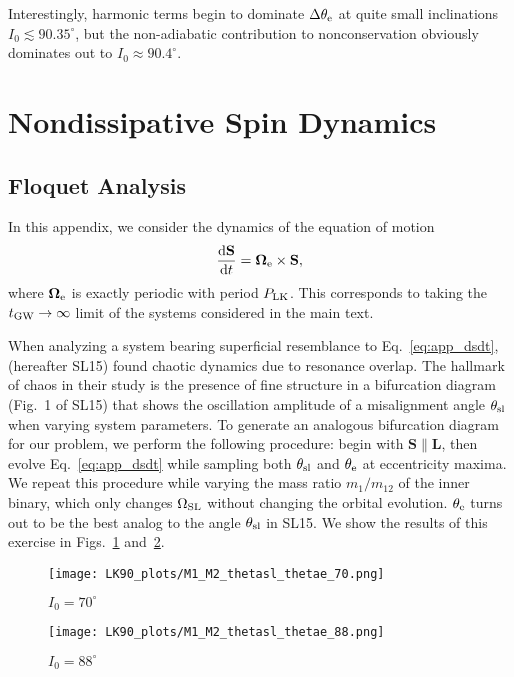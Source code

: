 \documentclass[
        twocolumn,
        twocolappendix
    ]{aastex63}
\newcommand*{\rd}[2]{\frac{\mathrm{d}#1}{\mathrm{d}#2}}
\renewcommand*{\bm}[1]{\boldsymbol{\mathbf{#1}}}
\begin{document}
Interestingly, harmonic terms begin to dominate $\Delta \theta_{\rm e}$ at quite
small inclinations $I_0 \lesssim 90.35^\circ$, but the non-adiabatic
contribution to nonconservation obviously dominates out to $I_0 \approx
90.4^\circ$.




\appendix

\section{Nondissipative Spin Dynamics}\label{app:nondisp}

\subsection{Floquet Analysis}

In this appendix, we consider the dynamics of the equation of motion
\begin{equation}
    \rd{\bm{S}}{t} = \bm{\Omega}_{\rm e} \times \bm{S},\label{eq:app_dsdt}
\end{equation}
where $\bm{\Omega}_{\rm e}$ is exactly periodic with period $P_{\rm LK}$. This
corresponds to taking the $t_{\rm GW} \to \infty$ limit of the systems
considered in the main text.

When analyzing a system bearing superficial resemblance to
Eq.~\eqref{eq:app_dsdt}, \citet{storch} (hereafter SL15) found chaotic dynamics
due to resonance overlap. The hallmark of chaos in their study is the presence
of fine structure in a bifurcation diagram (Fig.~1 of SL15) that shows the
oscillation amplitude of a misalignment angle $\theta_{\rm sl}$ when varying
system parameters. To generate an analogous bifurcation diagram for our problem,
we perform the following procedure: begin with $\bm{S} \parallel \bm{L}$, then
evolve Eq.~\eqref{eq:app_dsdt} while sampling both $\theta_{\rm sl}$ and
$\theta_{\rm e}$ at eccentricity maxima. We repeat this procedure while varying
the mass ratio $m_1 / m_{12}$ of the inner binary, which only changes
$\Omega_{\rm SL}$ without changing the orbital evolution. $\theta_{\rm e}$ turns
out to be the best analog to the angle $\theta_{\rm sl}$ in SL15. We show the
results of this exercise in Figs.~\ref{fig:bifurcation_70}
and~\ref{fig:bifurcation_88}.
\begin{figure}
    \centering
    \texttt{[image: LK90\_plots/M1\_M2\_thetasl\_thetae\_70.png]}
    \caption{$I_0 = 70^\circ$}\label{fig:bifurcation_70}
\end{figure}
\begin{figure}
    \centering
    \texttt{[image: LK90\_plots/M1\_M2\_thetasl\_thetae\_88.png]}
    \caption{$I_0 = 88^\circ$}\label{fig:bifurcation_88}
\end{figure}
\end{document}
